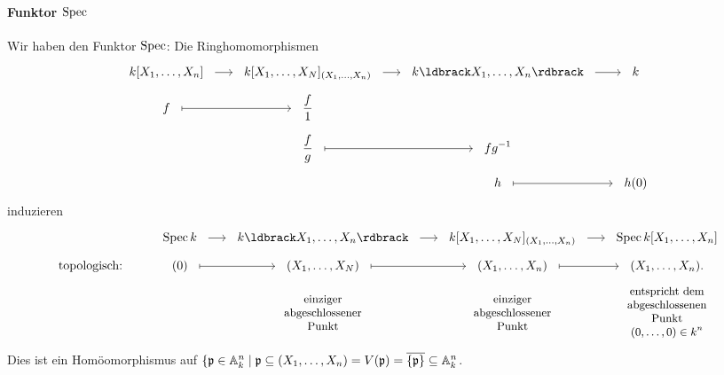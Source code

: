 \paragraph{Funktor $\operatorname{Spec}$} Wir haben den Funktor $\operatorname{Spec}$:
Die Ringhomomorphismen
\[\everymath{\displaystyle} \begin{tikzcd}[row sep=tiny, outer sep=5pt]
	k[X_1,\ldots,X_n] \rar & k[X_1,\ldots,X_N]_{(X_1,\ldots,X_n)} \rar &
		k\ldbrack X_1,\ldots,X_n \rdbrack \rar & k \\
	f \rar[mapsto] & \frac{f}{1} \\
	& \frac f g \rar[mapsto] & f g\inv \\
	&& h \rar[mapsto] & h(0)
\end{tikzcd}\]
induzieren 
\[\everymath{\displaystyle} \begin{tikzcd}[row sep=tiny, outer sep=5pt]
	&\Spec k \rar & k\ldbrack X_1,\ldots,X_n \rdbrack \rar & 
	k[X_1,\ldots,X_N]_{(X_1,\ldots,X_n)} \rar &
	\Spec k[X_1,\ldots,X_n] \\
	\text{topologisch:} &  
	(0) \rar[mapsto] & (X_1,\ldots,X_N)  \rar[mapsto]& 
	(X_1,\ldots,X_n) \rar[mapsto] & (X_1 , \ldots,X_n).\\
	&&\makebox[0pt]{\parbox{3cm}{\centering\small 
		einziger abgeschlossener Punkt}} 
	&\makebox[0pt]{\parbox{3cm}{\centering\small 
		einziger abgeschlossener Punkt}}
	&\makebox[0pt]{\parbox{3cm}{\centering\small 
		entspricht dem abgeschlossenen Punkt $(0,\ldots,0) \in k^n$}}
\end{tikzcd}\]
Dies ist ein Homöomorphismus auf $\{\mathfrak{p} \in \mathbb{A}_k^n \mid 
\mathfrak{p} \subseteq (X_1,\ldots,X_n) = V(\mathfrak{p}) = \overline{\{\mathfrak{p}\}} \subseteq \mathbb{A}_k^n$.

